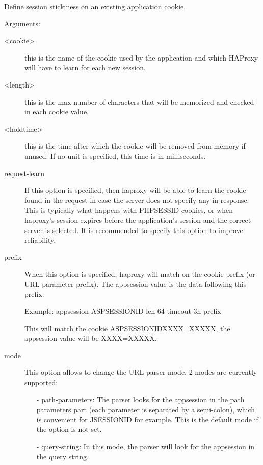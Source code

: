   Define session stickiness on an existing application cookie.
  

  Arguments:
  \begin{description}

  \item[<cookie>]
               this is the name of the cookie used by the application and which
               HAProxy will have to learn for each new session.

  \item[<length>]
               this is the max number of characters that will be memorized and
               checked in each cookie value.

  \item[<holdtime>]
               this is the time after which the cookie will be removed from
               memory if unused. If no unit is specified, this time is in
               milliseconds.

  \item[request-learn]
               If this option is specified, then haproxy will be able to learn
               the cookie found in the request in case the server does not
               specify any in response. This is typically what happens with
               PHPSESSID cookies, or when haproxy's session expires before
               the application's session and the correct server is selected.
               It is recommended to specify this option to improve reliability.

  \item[prefix]
               When this option is specified, haproxy will match on the cookie
               prefix (or URL parameter prefix). The appsession value is the
               data following this prefix.

               \begin{example}{Example:}
               appsession ASPSESSIONID len 64 timeout 3h prefix
               \end{example}

               This will match the cookie ASPSESSIONIDXXXX=XXXXX,
               the appsession value will be XXXX=XXXXX.

  \item[mode]
               This option allows to change the URL parser mode.
               2 modes are currently supported:
               \begin{itemize}
               \item[-] path-parameters:
                 The parser looks for the appsession in the path parameters
                 part (each parameter is separated by a semi-colon), which is
                 convenient for JSESSIONID for example.
                 This is the default mode if the option is not set.
               \item[-] query-string:
                 In this mode, the parser will look for the appsession in the
                 query string.
              \end{itemize}
  \end{description}

